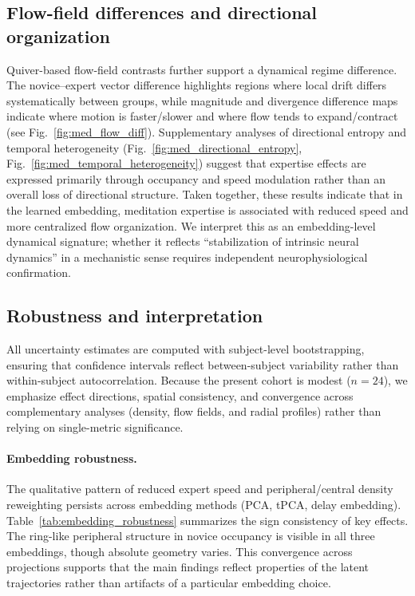 \documentclass[5p,twocolumn,authoryear]{elsarticle}
\newcommand{\figref}[1]{Fig.~\ref{#1}}
\begin{document}
\subsection{Flow-field differences and directional organization}
\label{sec:meditation_flow_fields}
Quiver-based flow-field contrasts further support a dynamical regime difference. The novice--expert vector difference highlights regions where local drift differs systematically between groups, while magnitude and divergence difference maps indicate where motion is faster/slower and where flow tends to expand/contract (see \figref{fig:med_flow_diff}). Supplementary analyses of directional entropy and temporal heterogeneity (\figref{fig:med_directional_entropy}, \figref{fig:med_temporal_heterogeneity}) suggest that expertise effects are expressed primarily through occupancy and speed modulation rather than an overall loss of directional structure. Taken together, these results indicate that in the learned embedding, meditation expertise is associated with reduced speed and more centralized flow organization. We interpret this as an embedding-level dynamical signature; whether it reflects ``stabilization of intrinsic neural dynamics'' in a mechanistic sense requires independent neurophysiological confirmation.

\subsection{Robustness and interpretation}
All uncertainty estimates are computed with subject-level bootstrapping, ensuring that confidence intervals reflect between-subject variability rather than within-subject autocorrelation. Because the present cohort is modest ($n=24$), we emphasize effect directions, spatial consistency, and convergence across complementary analyses (density, flow fields, and radial profiles) rather than relying on single-metric significance.

\paragraph{Embedding robustness.}
The qualitative pattern of reduced expert speed and peripheral/central density reweighting persists across embedding methods (PCA, tPCA, delay embedding). Table~\ref{tab:embedding_robustness} summarizes the sign consistency of key effects. The ring-like peripheral structure in novice occupancy is visible in all three embeddings, though absolute geometry varies. This convergence across projections supports that the main findings reflect properties of the latent trajectories rather than artifacts of a particular embedding choice.
\end{document}
